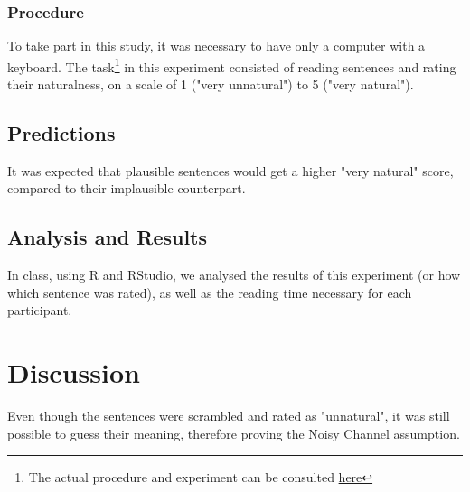 \documentclass{article}
\begin{document}
\subsubsection{Procedure}
To take part in this study, it was necessary to have only a computer with a keyboard. The task\footnote{The actual procedure and experiment can be consulted \href{https://farm.pcibex.net/p/ceZUkj/}{here}} in this experiment consisted of reading sentences and rating their naturalness, on a scale of 1 ("very unnatural") to 5 ("very natural").
\subsection{Predictions}
It was expected that plausible sentences would get a higher "very natural" score, compared to their implausible counterpart.
\subsection{Analysis and Results}
In class, using R and RStudio, we analysed the results of this experiment (or how which sentence was rated), as well as the reading time necessary for each participant.
\section{Discussion}
Even though the sentences were scrambled and rated as "unnatural", it was still possible to guess their meaning, therefore proving the Noisy Channel assumption.
\end{document}
